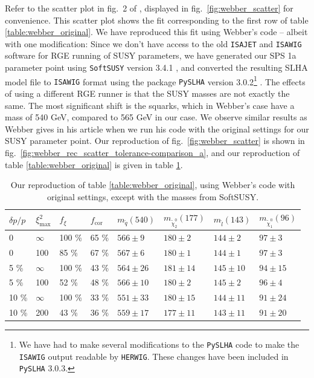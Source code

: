 \documentclass[twoside,english]{uiofysmaster}
\begin{document}
Refer to the scatter plot in fig.\ 2 of \cite{Webber:2009vm}, displayed in fig.\ \ref{fig:webber_scatter} for convenience. This scatter plot shows the fit corresponding to the first row of table \ref{table:webber_original}. We have reproduced this fit using Webber's code \cite{Webber:epost} -- albeit with one modification: Since we don't have access to the old {\tt ISAJET} and {\tt ISAWIG} software for RGE running of SUSY parameters, we have generated our SPS 1a parameter point using {\tt SoftSUSY} version 3.4.1 \cite{Allanach:2001kg}, and converted the resulting SLHA \cite{Skands:2003cj} model file to {\tt ISAWIG} format using the package {\tt PySLHA} version 3.0.2\footnote{We have had to make several modifications to the {\tt PySLHA} code to make the {\tt ISAWIG} output readable by {\tt HERWIG}. These changes have been included in {\tt PySLHA} 3.0.3.} \cite{Buckley:2013jua}. The effects of using a different RGE runner is that the SUSY masses are not exactly the same. The most significant shift is the squarks, which in Webber's case have a mass of 540 GeV, compared to 565 GeV in our case. We observe similar results as Webber gives in his article when we run his code with the original settings for our SUSY parameter point. Our reproduction of fig.\ \ref{fig:webber_scatter} is shown in fig.\ \ref{fig:webber_rec_scatter_tolerance-comparison_a}, and our reproduction of table \ref{table:webber_original} is given in table \ref{table:webber_softsusy}.

\begin{table}[hbt]
	\centering
	\begin{tabular}{| l | l | l | l  || l | l | l | l |}
		\hline
		$\delta p/p$ & $\xi^2_\mathrm{max}$ & $f_\xi$ & $f_\mathrm{cor}$ & $m_{\tilde q} (540)$ & $m_{\tilde \chi_2^0} (177)$ & $m_{\tilde l} (143)$ & $m_{\tilde \chi_1^0} (96)$ \\
		\hline \hline
		0 & 	$\infty$ &	100 \%	& 65 \%	& $566 \pm 9$	&	$180 \pm 2$		&	$144 \pm 2$	& 	$97 \pm 3$	\\
		0 &		100 &		85 \%	& 67 \% & $567 \pm 6$	&	$180 \pm 1$		&	$144 \pm 1$	&	$97 \pm 3$	\\
		5 \% &	$\infty$ &	100 \%	& 43 \% & $564 \pm 26$	& 	$181 \pm 14$	&	$145 \pm 10$&	$94 \pm 15$ \\
		5 \% &	100 &		52 \%	& 48 \% & $566 \pm 10$	&	$180 \pm 2$		& 	$145 \pm 2$	&	$96 \pm 4$	\\
		10 \% &	$\infty$ &	100 \%	& 33 \% & $551 \pm 33$	&	$180 \pm 15$	&	$144 \pm 11$&	$91 \pm 24$	\\
		10 \% &	200 &		43 \%	& 36 \% & $559 \pm 17$	& 	$177 \pm 11$	&	$143 \pm 11$&	$91 \pm 20$ \\
		\hline
	\end{tabular}
	\caption{Our reproduction of table \ref{table:webber_original}, using Webber's code \cite{Webber:epost} with original settings, except with the masses from SoftSUSY.}
	\label{table:webber_softsusy}
\end{table}
\end{document}
